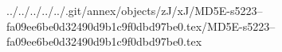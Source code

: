 ../../../../../.git/annex/objects/zJ/xJ/MD5E-s5223--fa09ee6be0d32490d9b1c9f0dbd97be0.tex/MD5E-s5223--fa09ee6be0d32490d9b1c9f0dbd97be0.tex